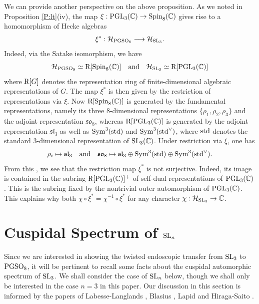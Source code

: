 \documentclass[11pt]{amsart}
\theoremstyle{plain}
\numberwithin{equation}{section}
\newcommand{\C}{\mathbb C}
\def\SL{{\rm SL}}
\def\PGSO{{\rm PGSO}}
\def\Spin{{\rm Spin}}
\def\Spin{{\rm Spin}}
\def\PGL{{\rm PGL}}
\def\C{{\bf C}}
\def\C{{\mathbb C}}
\begin{document}
\vskip 5pt
We can provide another perspective on the above proposition. As we noted in Proposition \ref{P:lt}(iv), the map $\xi: \PGL_3(\C) \rightarrow \Spin_8(\C)$ gives rise to a homomorphism of Hecke algebras
\[ \xi^*:  \mathcal{H}_{\PGSO_8} \longrightarrow  \mathcal{H}_{\SL_3}. \]
Indeed, via the Satake isomorphism, we have
\[  \mathcal{H}_{\PGSO_8}  \simeq  {\rm R}[\Spin_8(\C)] \quad \text{and} \quad  \mathcal{H}_{\SL_3} \simeq {\rm R}[\PGL_3(\C)] \]
where ${\rm R}[G]$ denotes the representation ring of finite-dimensional algebraic representations of $G$. 
The map $\xi^*$ is then given by the restriction of representations via $\xi$. 
Now ${\rm R}[\Spin_8(\C)]$ is generated by the fundamental representations, namely its  three 8-dimensional representations $\{ \rho_1, \rho_2, \rho_3 \}$ and the adjoint representation $\mathfrak{so}_8$, whereas ${\rm R}[\PGL_3(\C)]$ is generated by the adjoint representation $\mathfrak{sl}_3$ as well as ${\rm Sym}^3({\rm std})$ and  
$ {\rm Sym}^3({\rm std}^{\vee})$, where ${\rm std}$ denotes the standard 3-dimensional representation of $\SL_3(\C)$.
Under restriction via $\xi$, one has
\[ 
  \rho_i \mapsto  \mathfrak{sl}_3 \quad \text{and} \quad \mathfrak{so}_8 \mapsto  \mathfrak{sl}_3 \oplus {\rm Sym}^3({\rm std}) \oplus {\rm Sym}^3({\rm std}^{\vee}). \]
 From this , we see that the restriction map $\xi^*$ is not surjective. Indeed, its image is contained in the subring  ${\rm R}[\PGL_3(\C)]^+$ of self-dual representations of $\PGL_3(\C)$.  This is the subring fixed by the nontrivial outer automorphism of $\PGL_3(\C)$. This explains why both $\chi \circ \xi^* = \chi^{-1} \circ\xi^*$ for any character $\chi: \mathcal{H}_{\SL_3} \rightarrow \C$. 
\vskip 10pt



\section{\bf Cuspidal Spectrum of $\SL_n$} \label{SS:SLn}
Since we are interested in showing the twisted endoscopic transfer from $\SL_3$ to $\PGSO_8$, it will be pertinent to recall some facts about the cuspidal automorphic spectrum of $\SL_3$. We shall consider the case of $\SL_n$ below, though we shall only be interested in the case $n=3$ in this paper. Our discussion in this section is informed by the papers of Labesse-Langlands \cite{LL}, Blasius \cite{B}, Lapid \cite{L1} and Hiraga-Saito \cite{HiS1, HiS2}.
\vskip 5pt
\end{document}
